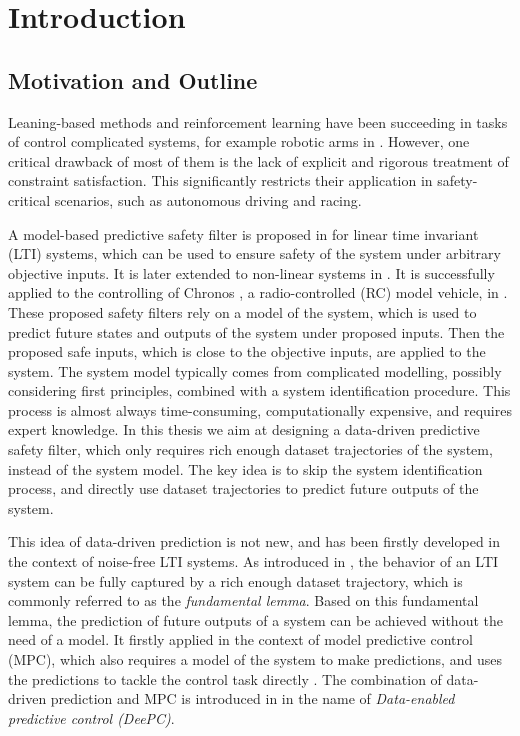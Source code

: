 \chapter{Introduction}\label{chap:introduction}


\section{Motivation and Outline}\label{sec:motivation-and-background}

Leaning-based methods and reinforcement learning have been succeeding in tasks of control complicated systems, for example robotic arms in \cite{levineEndtoEndTrainingDeep2016}.
However, one critical drawback of most of them is the lack of explicit and rigorous treatment of constraint satisfaction.
This significantly restricts their application in safety-critical scenarios, such as autonomous driving and racing.

A model-based predictive safety filter is proposed in \cite{wabersichLinearModelPredictive2018} for linear time invariant (LTI) systems, which can be used to ensure safety of the system under arbitrary objective inputs.
It is later extended to non-linear systems in \cite{wabersichPredictiveSafetyFilter2021a}.
It is successfully applied to the controlling of Chronos \cite{carronChronosCRSDesign2022}, a radio-controlled (RC) model vehicle, in \cite{tearlePredictiveSafetyFilterRacing2021}.
These proposed safety filters rely on a model of the system, which is used to predict future states and outputs of the system under proposed inputs.
Then the proposed safe inputs, which is close to the objective inputs, are applied to the system.
The system model typically comes from complicated modelling, possibly considering first principles, combined with a system identification procedure.
This process is almost always time-consuming, computationally expensive, and requires expert knowledge.
In this thesis we aim at designing a data-driven predictive safety filter, which only requires rich enough dataset trajectories of the system, instead of the system model.
The key idea is to skip the system identification process, and directly use dataset trajectories to predict future outputs of the system.

This idea of data-driven prediction is not new, and has been firstly developed in the context of noise-free LTI systems.
As introduced in \cite{willemsNotePersistencyExcitation2005}, the behavior of an LTI system can be fully captured by a rich enough dataset trajectory, which is commonly referred to as the \emph{fundamental lemma}.
Based on this fundamental lemma, the prediction of future outputs of a system can be achieved without the need of a model.
It firstly applied in the context of model predictive control (MPC), which also requires a model of the system to make predictions, and uses the predictions to tackle the control task directly \cite{garciaModelPredictiveControl1989}.
The combination of data-driven prediction and MPC is introduced in \cite{coulsonDataenabledPredictiveControl2019} in the name of \emph{Data-enabled predictive control (DeePC)}.

